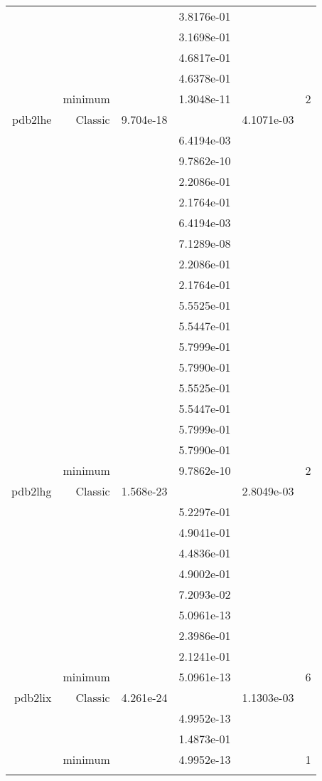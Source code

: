 \begin{xltabular}{\textwidth}{r|rS[table-format=1.3e+2]S[table-format=1.4e+2]S[table-format=1.4e+2]S[table-format=-1.5]}
&  &  & 3.8176e-01 & & \\
&  &  & 3.1698e-01 & & \\
&  &  & 4.6817e-01 & & \\
&  &  & 4.6378e-01 & & \\
& minimum &  & 1.3048e-11 & & 2 \\  \addlinespace
pdb2lhe & Classic & 9.704e-18 &  & 4.1071e-03 & \\
&  &  & 6.4194e-03 & & \\
&  &  & 9.7862e-10 & & \\
&  &  & 2.2086e-01 & & \\
&  &  & 2.1764e-01 & & \\
&  &  & 6.4194e-03 & & \\
&  &  & 7.1289e-08 & & \\
&  &  & 2.2086e-01 & & \\
&  &  & 2.1764e-01 & & \\
&  &  & 5.5525e-01 & & \\
&  &  & 5.5447e-01 & & \\
&  &  & 5.7999e-01 & & \\
&  &  & 5.7990e-01 & & \\
&  &  & 5.5525e-01 & & \\
&  &  & 5.5447e-01 & & \\
&  &  & 5.7999e-01 & & \\
&  &  & 5.7990e-01 & & \\
& minimum &  & 9.7862e-10 & & 2 \\  \addlinespace
pdb2lhg & Classic & 1.568e-23 &  & 2.8049e-03 & \\
&  &  & 5.2297e-01 & & \\
&  &  & 4.9041e-01 & & \\
&  &  & 4.4836e-01 & & \\
&  &  & 4.9002e-01 & & \\
&  &  & 7.2093e-02 & & \\
&  &  & 5.0961e-13 & & \\
&  &  & 2.3986e-01 & & \\
&  &  & 2.1241e-01 & & \\
& minimum &  & 5.0961e-13 & & 6 \\  \addlinespace
pdb2lix & Classic & 4.261e-24 &  & 1.1303e-03 & \\
&  &  & 4.9952e-13 & & \\
&  &  & 1.4873e-01 & & \\
& minimum &  & 4.9952e-13 & & 1 \\  \addlinespace

\end{xltabular}
